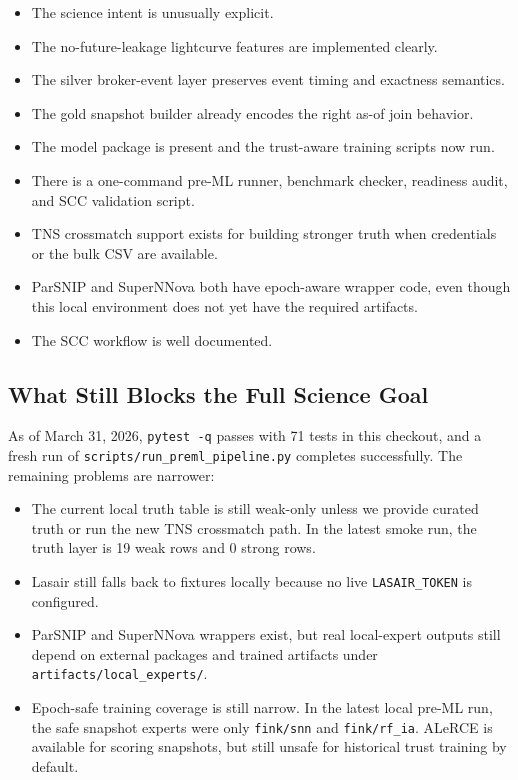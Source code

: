 \documentclass[11pt]{article}
\newcommand{\code}[1]{\texttt{#1}}
\begin{document}
\begin{itemize}
\item The science intent is unusually explicit.
\item The no-future-leakage lightcurve features are implemented clearly.
\item The silver broker-event layer preserves event timing and exactness semantics.
\item The gold snapshot builder already encodes the right as-of join behavior.
\item The model package is present and the trust-aware training scripts now run.
\item There is a one-command pre-ML runner, benchmark checker, readiness audit, and SCC validation script.
\item TNS crossmatch support exists for building stronger truth when credentials or the bulk CSV are available.
\item ParSNIP and SuperNNova both have epoch-aware wrapper code, even though this local environment does not yet have the required artifacts.
\item The SCC workflow is well documented.
\end{itemize}

\subsection{What Still Blocks the Full Science Goal}

As of March 31, 2026, \code{pytest -q} passes with 71 tests in this checkout, and a fresh run of \code{scripts/run\_preml\_pipeline.py} completes successfully. The remaining problems are narrower:

\begin{itemize}
\item The current local truth table is still weak-only unless we provide curated truth or run the new TNS crossmatch path. In the latest smoke run, the truth layer is 19 weak rows and 0 strong rows.
\item Lasair still falls back to fixtures locally because no live \code{LASAIR\_TOKEN} is configured.
\item ParSNIP and SuperNNova wrappers exist, but real local-expert outputs still depend on external packages and trained artifacts under \code{artifacts/local\_experts/}.
\item Epoch-safe training coverage is still narrow. In the latest local pre-ML run, the safe snapshot experts were only \code{fink/snn} and \code{fink/rf\_ia}. ALeRCE is available for scoring snapshots, but still unsafe for historical trust training by default.
\end{itemize}
\end{document}
